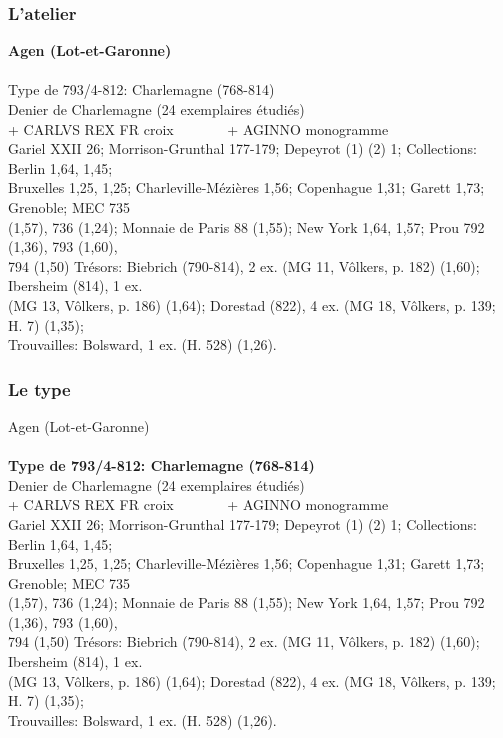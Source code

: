 \documentclass[10pt, compress]{beamer}
\begin{document}
\begin{frame}[fragile]
  \frametitle{L'atelier}
  \begin{scriptsize}
\textbf{Agen (Lot-et-Garonne)}\\~\\
\textcolor{light_gray}{
Type de 793/4-812: Charlemagne (768-814)\\
Denier de Charlemagne (24 exemplaires étudiés)\\
+ CARLVS REX FR croix~~~~~~~ + AGINNO monogramme\\
Gariel XXII 26; Morrison-Grunthal 177-179; Depeyrot (1) (2) 1; Collections: Berlin 1,64, 1,45; \\
Bruxelles 1,25, 1,25; Charleville-Mézières 1,56; Copenhague 1,31; Garett 1,73; Grenoble; MEC 735 \\
(1,57), 736 (1,24); Monnaie de Paris 88 (1,55); New York 1,64, 1,57; Prou 792 (1,36), 793 (1,60), \\
794 (1,50) Trésors: Biebrich (790-814), 2 ex. (MG 11, Vôlkers, p. 182) (1,60); Ibersheim (814), 1 ex. \\
(MG 13, Vôlkers, p. 186) (1,64); Dorestad (822), 4 ex. (MG 18, Vôlkers, p. 139; H. 7) (1,35); \\Trouvailles: Bolsward, 1 ex. (H. 528) (1,26).
} 
    \end{scriptsize}
    
\end{frame}

\begin{frame}[fragile]
  \frametitle{Le type}
  \begin{scriptsize}
\textcolor{light_gray}{Agen (Lot-et-Garonne)}\\~\\

\textbf{Type de 793/4-812: Charlemagne (768-814)}\\
\textcolor{light_gray}{
Denier de Charlemagne (24 exemplaires étudiés)\\
+ CARLVS REX FR croix~~~~~~~ + AGINNO monogramme\\
Gariel XXII 26; Morrison-Grunthal 177-179; Depeyrot (1) (2) 1; Collections: Berlin 1,64, 1,45; \\
Bruxelles 1,25, 1,25; Charleville-Mézières 1,56; Copenhague 1,31; Garett 1,73; Grenoble; MEC 735 \\
(1,57), 736 (1,24); Monnaie de Paris 88 (1,55); New York 1,64, 1,57; Prou 792 (1,36), 793 (1,60), \\
794 (1,50) Trésors: Biebrich (790-814), 2 ex. (MG 11, Vôlkers, p. 182) (1,60); Ibersheim (814), 1 ex. \\
(MG 13, Vôlkers, p. 186) (1,64); Dorestad (822), 4 ex. (MG 18, Vôlkers, p. 139; H. 7) (1,35); \\Trouvailles: Bolsward, 1 ex. (H. 528) (1,26).
} 
    \end{scriptsize}
    
\end{frame}
\end{document}
